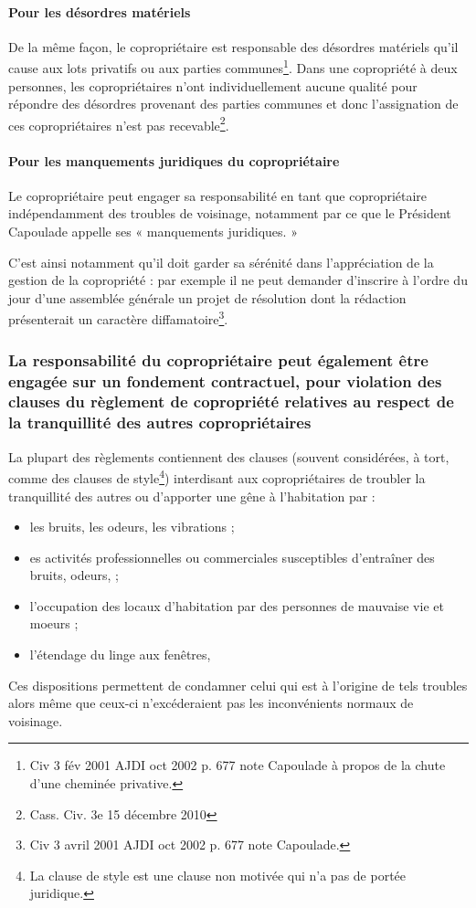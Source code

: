			\paragraph{Pour les désordres matériels}
	
				De la même façon, le copropriétaire est responsable des désordres matériels qu’il cause aux lots privatifs ou aux parties communes\footnote{Civ 3 fév 2001 AJDI oct 2002 p. 677 note Capoulade à propos de la chute d’une cheminée privative.}.
				Dans une copropriété à deux personnes, les copropriétaires n’ont individuellement aucune qualité pour répondre des désordres provenant des parties communes et donc l’assignation de ces copropriétaires n’est pas recevable\footnote{Cass. Civ. 3e 15 décembre 2010}.
			
			\paragraph{Pour les manquements juridiques du copropriétaire}
			
			Le copropriétaire peut engager sa responsabilité en tant que copropriétaire indépendamment des troubles de voisinage, notamment par ce que le Président Capoulade appelle ses « manquements juridiques. »
			
			C’est ainsi notamment qu’il doit garder sa sérénité dans l’appréciation de la gestion de la copropriété : par exemple il ne peut demander d’inscrire à l’ordre du jour d’une assemblée générale un projet de résolution dont la rédaction présenterait un caractère diffamatoire\footnote{Civ 3 avril 2001 AJDI oct 2002 p. 677 note Capoulade.}.
		
		\subsubsection{La responsabilité du copropriétaire peut également être engagée sur un fondement contractuel, pour violation des clauses du règlement de copropriété relatives au respect de la tranquillité des autres copropriétaires}
		
			La plupart des règlements contiennent des clauses (souvent considérées, à tort, comme des clauses de style\footnote{La clause de style est une clause non motivée qui n’a pas de portée juridique.}) interdisant aux copropriétaires de troubler la tranquillité des autres ou d'apporter une gêne à l'habitation par :
			\begin{itemize}
				\item les bruits, les odeurs, les vibrations ;
				\item es activités professionnelles ou commerciales susceptibles d'entraîner des bruits, odeurs, \etc ;
				\item l'occupation des locaux d'habitation par des personnes de mauvaise vie et moeurs ;
				\item l'étendage du linge aux fenêtres, \etc
			\end{itemize}
			Ces dispositions permettent de condamner celui qui est à l'origine de tels troubles alors même que ceux-ci n'excéderaient pas les inconvénients normaux de voisinage.
			
